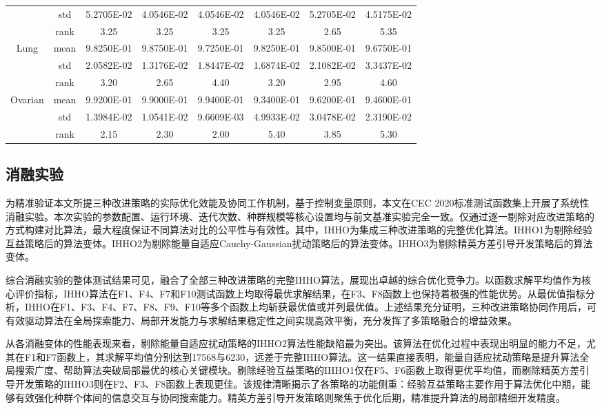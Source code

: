 \documentclass{wzuthesis}
\begin{document}
\begin{table}[htbp]
\begin{tabular}{cccccccc}
          & std   & 5.2705E-02 & 4.0546E-02 & 4.0546E-02 & 4.0546E-02 & 5.2705E-02 & 4.5175E-02 \\
          & rank  & 3.25  & 3.25  & 3.25  & 3.25  & 2.65  & 5.35 \\
    \multirow{3}[0]{*}{Lung} & mean  & 9.8250E-01 & 9.8750E-01 & 9.7250E-01 & 9.8250E-01 & 9.8500E-01 & 9.6750E-01 \\
          & std   & 2.0582E-02 & 1.3176E-02 & 1.8447E-02 & 1.6874E-02 & 2.1082E-02 & 3.3437E-02 \\
          & rank  & 3.20  & 2.65  & 4.40  & 3.20  & 2.95  & 4.60 \\
    \multirow{3}[1]{*}{Ovarian} & mean  & 9.9200E-01 & 9.9000E-01 & 9.9400E-01 & 9.3400E-01 & 9.6200E-01 & 9.4600E-01 \\
          & std   & 1.3984E-02 & 1.0541E-02 & 9.6609E-03 & 4.9933E-02 & 3.0478E-02 & 2.3190E-02 \\
          & rank  & 2.15  & 2.30  & 2.00  & 5.40  & 3.85  & 5.30 \\
    \bottomrule
    \end{tabular}%
  \label{tb:IHHO-acc}%
\end{table}%

\subsection{消融实验}
为精准验证本文所提三种改进策略的实际优化效能及协同工作机制，基于控制变量原则，本文在CEC 2020标准测试函数集上开展了系统性消融实验。本次实验的参数配置、运行环境、迭代次数、种群规模等核心设置均与前文基准实验完全一致。仅通过逐一剔除对应改进策略的方式构建对比算法，最大程度保证不同算法对比的公平性与有效性。其中，IHHO为集成三种改进策略的完整优化算法。IHHO1为剔除经验互益策略后的算法变体。IHHO2为剔除能量自适应Cauchy-Gaussian扰动策略后的算法变体。IHHO3为剔除精英方差引导开发策略后的算法变体。

综合消融实验的整体测试结果可见，融合了全部三种改进策略的完整IHHO算法，展现出卓越的综合优化竞争力。以函数求解平均值作为核心评价指标，IHHO算法在F1、F4、F7和F10测试函数上均取得最优求解结果，在F3、F8函数上也保持着极强的性能优势。从最优值指标分析，IHHO在F1、F3、F4、F7、F8、F9、F10等多个函数上均斩获最优值或并列最优值。上述结果充分证明，三种改进策略协同作用后，可有效驱动算法在全局探索能力、局部开发能力与求解结果稳定性之间实现高效平衡，充分发挥了多策略融合的增益效果。

从各消融变体的性能表现来看，剔除能量自适应扰动策略的IHHO2算法性能缺陷最为突出。该算法在优化过程中表现出明显的能力不足，尤其在F1和F7函数上，其求解平均值分别达到17568与6230，远差于完整IHHO算法。这一结果直接表明，能量自适应扰动策略是提升算法全局搜索广度、帮助算法突破局部最优的核心关键模块。剔除经验互益策略的IHHO1仅在F5、F6函数上取得更优平均值，而剔除精英方差引导开发策略的IHHO3则在F2、F3、F8函数上表现更佳。该规律清晰揭示了各策略的功能侧重：经验互益策略主要作用于算法优化中期，能够有效强化种群个体间的信息交互与协同搜索能力。精英方差引导开发策略则聚焦于优化后期，精准提升算法的局部精细开发精度。
\end{document}
